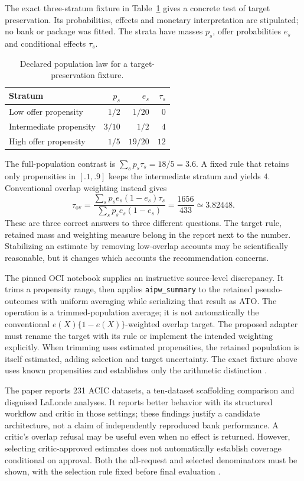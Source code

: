 The exact three-stratum fixture in Table~\ref{exec14:target-table} gives a
concrete test of target preservation. Its probabilities, effects and monetary
interpretation are stipulated; no bank or package was fitted. The strata have
masses $p_s$, offer probabilities $e_s$ and conditional effects $\tau_s$.
\begin{table}[htbp]
\centering
\caption{Declared population law for a target-preservation fixture.}
\label{exec14:target-table}
\begin{tabular}{lrrr}
\toprule
Stratum & $p_s$ & $e_s$ & $\tau_s$\\
\midrule
Low offer propensity & $1/2$ & $1/20$ & $0$\\
Intermediate propensity & $3/10$ & $1/2$ & $4$\\
High offer propensity & $1/5$ & $19/20$ & $12$\\
\bottomrule
\end{tabular}
\end{table}
The full-population contrast is $\sum_s p_s\tau_s=18/5=3.6$. A fixed rule that
retains only propensities in $[.1,.9]$ keeps the intermediate stratum and yields
$4$. Conventional overlap weighting instead gives
\[
 \tau_{\mathrm{ov}}=
 \frac{\sum_s p_s e_s(1-e_s)\tau_s}{\sum_s p_s e_s(1-e_s)}
 =\frac{1656}{433}\simeq3.82448.
\]
These are three correct answers to three different questions. The target rule,
retained mass and weighting measure belong in the report next to the number.
Stabilizing an estimate by removing low-overlap accounts may be scientifically
reasonable, but it changes which accounts the recommendation concerns.

The pinned OCI notebook supplies an instructive source-level discrepancy. It
trims a propensity range, then applies \texttt{aipw\_summary} to the retained
pseudo-outcomes with uniform averaging while serializing that result as ATO.
The operation is a trimmed-population average; it is not automatically the
conventional $e(X)\{1-e(X)\}$-weighted overlap target. The proposed adapter must
rename the target with its rule or implement the intended weighting explicitly.
When trimming uses estimated propensities, the retained population is itself
estimated, adding selection and target uncertainty. The exact fixture above
uses known propensities and establishes only the arithmetic distinction
\citep{exec14_estimation_sources,exec14_estimation_oracles}.

The paper reports 231 ACIC datasets, a ten-dataset scaffolding comparison and
disguised LaLonde analyses. It reports better behavior with its structured
workflow and critic in those settings; these findings justify a candidate
architecture, not a claim of independently reproduced bank performance. A
critic's overlap refusal may be useful even when no effect is returned.
However, selecting critic-approved estimates does not automatically establish
coverage conditional on approval. Both the all-request and selected denominators
must be shown, with the selection rule fixed before final evaluation
\citep{v12_la_2607_22443}.

